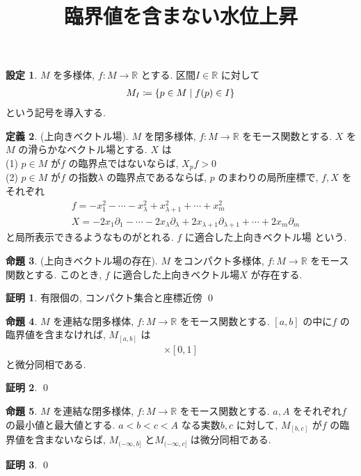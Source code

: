 \documentclass[10pt, fleqn, label-section=none]{bxjsarticle}
\title{臨界値を含まない水位上昇}
\date{}
\author{}
\theoremstyle{definition}
\newtheorem{dfn}{定義}[section]
\newtheorem{prop}[dfn]{命題}
\newtheorem{setting}[dfn]{設定}
\newtheorem*{pf*}{証明}
\newcommand{\cbra}[1]{\mleft\{#1\mright\}}
\renewcommand{\;}{\, ; \,}
\begin{document}
\maketitle

\section{}


\begin{setting} $M$ を多様体, $f: M \rightarrow \mathbb R$ とする. 区間$ I \in \mathbb R$ に対して
\begin{align*}  M_{I}  \coloneqq  \cbra{p \in M \mid f(p) \in  I}   \end{align*}
という記号を導入する. 
\end{setting}



\begin{dfn}(上向きベクトル場). $M$ を閉多様体, $f: M \rightarrow \mathbb R$ をモース関数とする. $X$ を$M$ の滑らかなベクトル場とする. $X$ は \\
(1) $p \in M$ が$f$ の臨界点ではないならば, $X_p f > 0$ \\
(2) $p \in M $ が$f$ の指数$\lambda$ の臨界点であるならば, $p$ のまわりの局所座標で, $f, X$ をそれぞれ \\  
\begin{align*} \quad f = -x_1 ^2 - \cdots - x^2_{\lambda} + x^2_{\lambda + 1} + \cdots + x^2_m \\
\quad X =  - 2x_1 \partial_1 - \cdots - 2 x_{\lambda } \partial_\lambda + 2 x_{\lambda + 1} \partial_{\lambda + 1} + \cdots + 2x_m \partial_m \end{align*}
と局所表示できるようなものがとれる. 
$f$ に適合した上向きベクトル場 という. 
\end{dfn}

\begin{prop}(上向きベクトル場の存在). $M$ をコンパクト多様体, $f: M \rightarrow \mathbb R$ をモース関数とする. このとき, $f$ に適合した上向きベクトル場$X$ が存在する.

\end{prop}
\begin{pf*}
有限個の, コンパクト集合と座標近傍
\qed
\end{pf*}



\begin{prop}
$M$ を連結な閉多様体, $f: M \rightarrow \mathbb R$ をモース関数とする. $[a,b]$ の中に$f$ の臨界値を含まなければ, $M_{[a,b]}$ は
\begin{align*} [f = a] \times [0,1]  \end{align*}
と微分同相である. 
\end{prop}
\begin{pf*}

\qed
\end{pf*}




\begin{prop} $M$ を連結な閉多様体, $f: M \rightarrow \mathbb R$ をモース関数とする. $a, A$ をそれぞれ$f$ の最小値と最大値とする. $a < b < c < A$ なる実数$b, c$ に対して, $M_{[b,c]}$ が$f$ の臨界値を含まないならば, $M_{( - \infty, b]}$ と$M_{( - \infty, c]} $ は微分同相である.   

\end{prop}
\begin{pf*}

\qed
\end{pf*}
\end{document}
